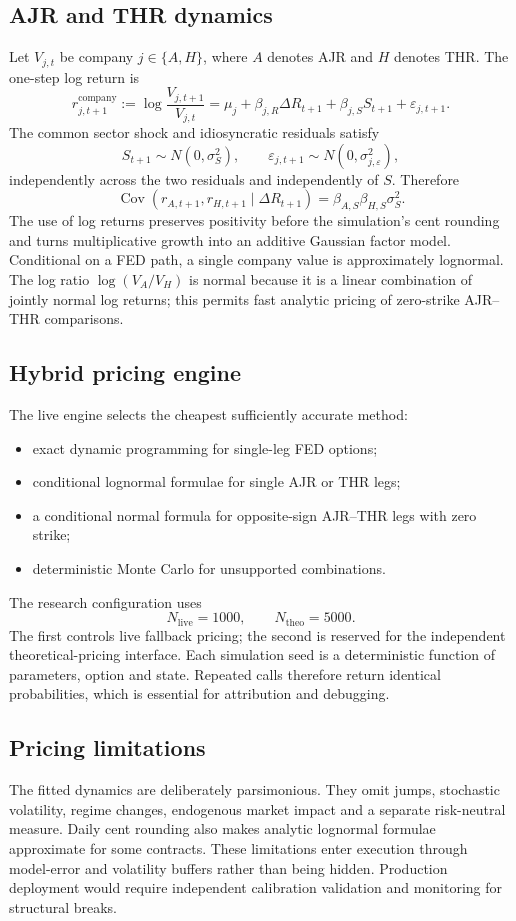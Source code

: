 \documentclass[10pt,a4paper]{article}
\newcommand{\Cov}{\operatorname{Cov}}
\newcommand{\1}{\mathbf{1}}
\begin{document}
\subsection{AJR and THR dynamics}
Let $V_{j,t}$ be company $j\in\{A,H\}$, where $A$ denotes AJR and $H$ denotes THR.
The one-step log return is
\[
 r_{j,t+1}^{\mathrm{company}}
 :=\log\frac{V_{j,t+1}}{V_{j,t}}
 =\mu_j+\beta_{j,R}\Delta R_{t+1}
 +\beta_{j,S}S_{t+1}+\varepsilon_{j,t+1}.
\]
The common sector shock and idiosyncratic residuals satisfy
\[
 S_{t+1}\sim N(0,\sigma_S^2),\qquad
 \varepsilon_{j,t+1}\sim N(0,\sigma_{j,\varepsilon}^2),
\]
independently across the two residuals and independently of $S$.  Therefore
\[
 \Cov(r_{A,t+1},r_{H,t+1}\mid\Delta R_{t+1})
 =\beta_{A,S}\beta_{H,S}\sigma_S^2.
\]
The use of log returns preserves positivity before the simulation's cent rounding and
turns multiplicative growth into an additive Gaussian factor model.  Conditional on a
FED path, a single company value is approximately lognormal.  The log ratio
$\log(V_A/V_H)$ is normal because it is a linear combination of jointly normal log
returns; this permits fast analytic pricing of zero-strike AJR--THR comparisons.

\subsection{Hybrid pricing engine}
The live engine selects the cheapest sufficiently accurate method:
\begin{itemize}
  \item exact dynamic programming for single-leg FED options;
  \item conditional lognormal formulae for single AJR or THR legs;
  \item a conditional normal formula for opposite-sign AJR--THR legs with zero strike;
  \item deterministic Monte Carlo for unsupported combinations.
\end{itemize}
The research configuration uses
\[
 N_{\mathrm{live}}=1000,\qquad N_{\mathrm{theo}}=5000.
\]
The first controls live fallback pricing; the second is reserved for the independent
theoretical-pricing interface.  Each simulation seed is a deterministic function of
parameters, option and state.  Repeated calls therefore return identical probabilities,
which is essential for attribution and debugging.

\subsection{Pricing limitations}
The fitted dynamics are deliberately parsimonious.  They omit jumps, stochastic
volatility, regime changes, endogenous market impact and a separate risk-neutral
measure.  Daily cent rounding also makes analytic lognormal formulae approximate for
some contracts.  These limitations enter execution through model-error and volatility
buffers rather than being hidden.  Production deployment would require independent
calibration validation and monitoring for structural breaks.
\end{document}
